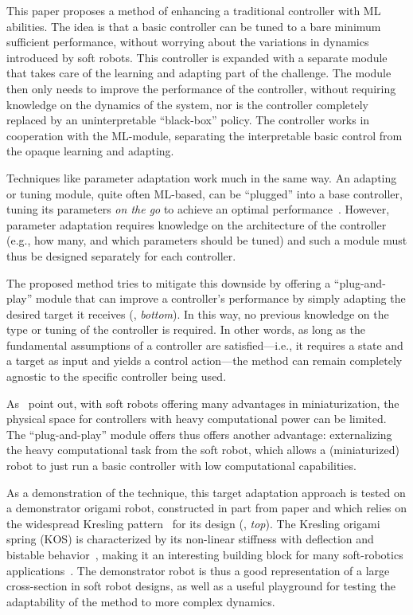 This paper proposes a method of enhancing a traditional controller with ML abilities.
The idea is that a basic controller can be tuned to a bare minimum sufficient performance, without worrying about the variations in dynamics introduced by soft robots.
This controller is expanded with a separate module that takes care of the learning and adapting part of the challenge.
The module then only needs to improve the performance of the controller, without requiring knowledge on the dynamics of the system, nor is the controller completely replaced by an uninterpretable ``black-box'' policy.
The controller works in cooperation with the ML-module, separating the interpretable basic control from the opaque learning and adapting.

Techniques like parameter adaptation work much in the same way.
An adapting or tuning module, quite often ML-based, can be ``plugged'' into a base controller, tuning its parameters \emph{on the go} to achieve an optimal performance~\parencite{Annaswamy2021,Landau2011}.
However, parameter adaptation requires knowledge on the architecture of the controller (e.g., how many, and which parameters should be tuned) and such a module must thus be designed separately for each controller.

The proposed method tries to mitigate this downside by offering a ``plug-and-play'' module that can improve a controller's performance by simply adapting the desired target it receives (, \emph{bottom}).
In this way, no previous knowledge on the type or tuning of the controller is required.
In other words, as long as the fundamental assumptions of a controller are satisfied—i.e., it requires a state and a target as input and yields a control action—the method can remain completely agnostic to the specific controller being used.

As~\textcite{Tang2022a} point out, with soft robots offering many advantages in miniaturization, the physical space for controllers with heavy computational power can be limited.
The ``plug-and-play'' module offers thus offers another advantage: externalizing the heavy computational task from the soft robot, which allows a (miniaturized) robot to just run a basic controller with low computational capabilities.

As a demonstration of the technique, this target adaptation approach is tested on a demonstrator origami robot, constructed in part from paper and which relies on the widespread Kresling pattern~\parencite{Kresling2008} for its design (, \emph{top}).
The Kresling origami spring (KOS) is characterized by its non-linear stiffness with deflection and bistable behavior~\parencite{Masana2019}, making it an interesting building block for many soft-robotics applications~\parencite{Masana1993}.
The demonstrator robot is thus a good representation of a large cross-section in soft robot designs, as well as a useful playground for testing the adaptability of the method to more complex dynamics.

